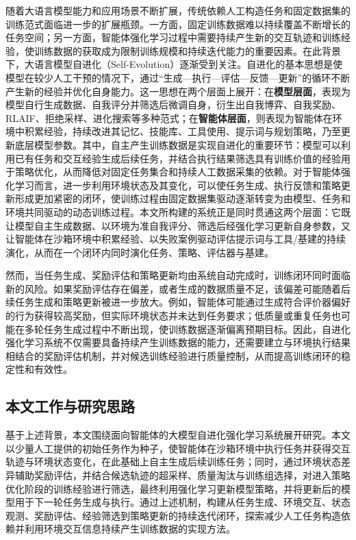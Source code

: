 随着大语言模型能力和应用场景不断扩展，传统依赖人工构造任务和固定数据集的训练范式面临进一步的扩展瓶颈。一方面，固定训练数据难以持续覆盖不断增长的任务空间；另一方面，智能体强化学习过程中需要持续产生新的交互轨迹和训练经验，使训练数据的获取成为限制训练规模和持续迭代能力的重要因素。在此背景下，大语言模型自进化（Self-Evolution）逐渐受到关注。自进化的基本思想是使模型在较少人工干预的情况下，通过“生成—执行—评估—反馈—更新”的循环不断产生新的经验并优化自身能力。这一思想在两个层面上展开：在\textbf{模型层面}，表现为模型自行生成数据、自我评分并筛选后微调自身，衍生出自我博弈、自我奖励、RLAIF、拒绝采样、进化搜索等多种范式；在\textbf{智能体层面}，则表现为智能体在环境中积累经验，持续改进其记忆、技能库、工具使用、提示词与规划策略，乃至更新底层模型参数。其中，自主产生训练数据是实现自进化的重要环节：模型可以利用已有任务和交互经验生成后续任务，并结合执行结果筛选具有训练价值的经验用于策略优化，从而降低对固定任务集合和持续人工数据采集的依赖。对于智能体强化学习而言，进一步利用环境状态及其变化，可以使任务生成、执行反馈和策略更新形成更加紧密的闭环，使训练过程由固定数据集驱动逐渐转变为由模型、任务和环境共同驱动的动态训练过程。本文所构建的系统正是同时贯通这两个层面：它既让模型自主生成数据、以环境为准自我评分、筛选后经强化学习更新自身参数，又让智能体在沙箱环境中积累经验、以失败案例驱动评估提示词与工具/基建的持续演化，从而在一个闭环内同时演化任务、策略、评估器与基建。

然而，当任务生成、奖励评估和策略更新均由系统自动完成时，训练闭环同时面临新的风险。如果奖励评估存在偏差，或者生成的数据质量不足，该偏差可能随着后续任务生成和策略更新被进一步放大。例如，智能体可能通过生成符合评价器偏好的行为获得较高奖励，但实际环境状态并未达到任务要求；低质量或重复任务也可能在多轮任务生成过程中不断出现，使训练数据逐渐偏离预期目标。因此，自进化强化学习系统不仅需要具备持续产生训练数据的能力，还需要建立与环境执行结果相结合的奖励评估机制，并对候选训练经验进行质量控制，从而提高训练闭环的稳定性和有效性。

\subsection{本文工作与研究思路}

基于上述背景，本文围绕面向智能体的大模型自进化强化学习系统展开研究。本文以少量人工提供的初始任务作为种子，使智能体在沙箱环境中执行任务并获得交互轨迹与环境状态变化，在此基础上自主生成后续训练任务；同时，通过环境状态差异辅助奖励评估，并结合候选轨迹的超采样、质量淘汰与训练组选择，对进入策略优化阶段的训练经验进行筛选，最终利用强化学习更新模型策略，并将更新后的模型用于下一轮任务生成与执行。通过上述机制，构建从任务生成、环境交互、状态观测、奖励评估、经验筛选到策略更新的持续迭代闭环，探索减少人工任务构造依赖并利用环境交互信息持续产生训练数据的实现方法。

